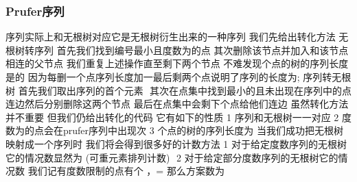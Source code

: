 \documentclass[8pt,a4paper]{article}
\newcommand{\code}[1]{
    
}
\newcommand{\txt}[1]{\par\noindent\footnotesize #1}
\newcommand{\inlineformula}[1]{\ensuremath{}}
\begin{document}
\begin{multicols}{2}
        \subsubsection{Prufer序列}
            \txt{\inlineformula{./assets/formulas_tex/formula_323.tex}序列实际上和无根树对应它是无根树衍生出来的一种序列
我们先给出转化方法
\inlineformula{./assets/formulas_tex/formula_324.tex}无根树转\inlineformula{./assets/formulas_tex/formula_325.tex}序列
首先我们找到编号最小且度数为\inlineformula{./assets/formulas_tex/formula_326.tex}的点
其次删除该节点并加入和该节点相连的父节点
我们重复上述操作直至剩下两个节点
不难发现\inlineformula{./assets/formulas_tex/formula_327.tex}个点的树的\inlineformula{./assets/formulas_tex/formula_328.tex}序列长度是\inlineformula{./assets/formulas_tex/formula_329.tex}的
因为每删一个点\inlineformula{./assets/formulas_tex/formula_330.tex}序列长度加一最后剩两个点说明了\inlineformula{./assets/formulas_tex/formula_331.tex}序列的长度为\inlineformula{./assets/formulas_tex/formula_332.tex};
\inlineformula{./assets/formulas_tex/formula_333.tex}\inlineformula{./assets/formulas_tex/formula_334.tex}序列转无根树
首先我们取出\inlineformula{./assets/formulas_tex/formula_335.tex}序列的首个元素 \inlineformula{./assets/formulas_tex/formula_336.tex}
其次在点集中找到最小的且未出现在\inlineformula{./assets/formulas_tex/formula_337.tex}序列中的点\inlineformula{./assets/formulas_tex/formula_338.tex} 连边\inlineformula{./assets/formulas_tex/formula_339.tex}然后分别删除这两个节点
最后在点集中会剩下\inlineformula{./assets/formulas_tex/formula_340.tex}个点给他们连边
虽然转化方法并不重要 但我们仍给出转化的代码
它有如下的性质
1 \inlineformula{./assets/formulas_tex/formula_341.tex}序列和无根树一一对应
2 度数为\inlineformula{./assets/formulas_tex/formula_342.tex}的点会在prufer序列中出现\inlineformula{./assets/formulas_tex/formula_343.tex}次
3 \inlineformula{./assets/formulas_tex/formula_344.tex}个点的树的\inlineformula{./assets/formulas_tex/formula_345.tex}序列长度为\inlineformula{./assets/formulas_tex/formula_346.tex}
当我们成功把无根树映射成一个序列时 我们将会得到很多好的计数方法
1 对于给定度数序列\inlineformula{./assets/formulas_tex/formula_347.tex}的无根树它的情况数显然为 (可重元素排列计数)
\inlineformula{./assets/formulas_tex/formula_348.tex}
2 对于给定部分度数序列的无根树它的情况数
我们记有度数限制的点有\inlineformula{./assets/formulas_tex/formula_349.tex}个 ，\inlineformula{./assets/formulas_tex/formula_350.tex}=\inlineformula{./assets/formulas_tex/formula_351.tex}
那么方案数为\inlineformula{./assets/formulas_tex/formula_352.tex}}
            \code{src/number_theory/树计数_6.cpp}

\end{multicols}
\end{document}
